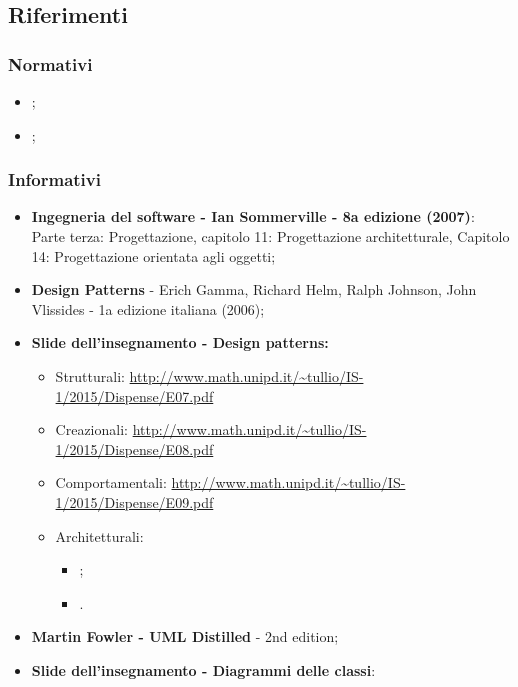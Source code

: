 \subsection{Riferimenti}
\subsubsection{Normativi}
\begin{itemize}
	\item \textit{\NdPv};
	\item \textit{\AdRvDue};
\end{itemize}
\subsubsection{Informativi}
\begin{itemize}
	\item \textbf{Ingegneria del software - Ian Sommerville - 8a edizione (2007)}: \\
	Parte terza: Progettazione, capitolo 11: Progettazione architetturale, Capitolo 14: Progettazione orientata agli oggetti;
	\item \textbf{Design Patterns} - Erich Gamma, Richard Helm, Ralph Johnson, John Vlissides - 1a edizione italiana (2006);
	\item \textbf{Slide dell'insegnamento - Design patterns:}
	\begin{itemize}
		\item Strutturali: \url{http://www.math.unipd.it/~tullio/IS-1/2015/Dispense/E07.pdf}
		\item Creazionali: \url{http://www.math.unipd.it/~tullio/IS-1/2015/Dispense/E08.pdf}
		\item Comportamentali: \url{http://www.math.unipd.it/~tullio/IS-1/2015/Dispense/E09.pdf}
		\item Architetturali:
			\begin{itemize}
				\item {};
				\item {}.
			\end{itemize} 
	\end{itemize}
	\item \textbf{Martin Fowler - UML Distilled} - 2nd edition;
	\item \textbf{Slide dell'insegnamento - Diagrammi delle classi}: \\

\end{itemize}
